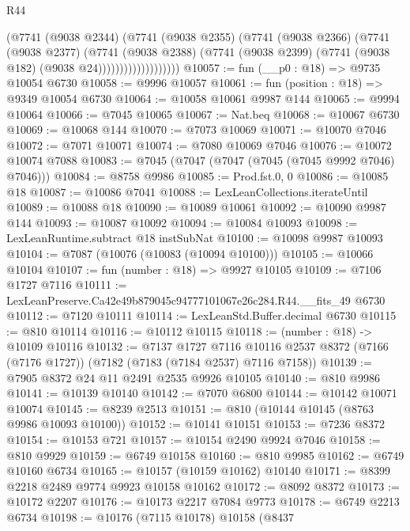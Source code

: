 \begin{lexlean}{R44}
\begin{coremodule}
{                          (@7741
                            (@9038 @2344)
                            (@7741
                              (@9038 @2355)
                              (@7741
                                (@9038 @2366)
                                (@7741
                                  (@9038 @2377)
                                  (@7741
                                    (@9038 @2388)
                                    (@7741
                                      (@9038 @2399)
                                      (@7741 (@9038 @182) (@9038 @24)))))))))))))))))))
@10057 := fun (__p0 : @18) => @9735 @10054 @6730
@10058 := @9996 @10057
@10061 := fun (position : @18) => @9349 @10054 @6730
@10064 := @10058 @10061 @9987 @144
@10065 := @9994 @10064
@10066 := @7045 @10065
@10067 := Nat.beq
@10068 := @10067 @6730
@10069 := @10068 @144
@10070 := @7073 @10069
@10071 := @10070 @7046
@10072 := @7071 @10071
@10074 := @7080 @10069 @7046
@10076 := @10072 @10074 @7088
@10083 := @7045 (@7047 (@7047 (@7045 (@7045 @9992 @7046) @7046)))
@10084 := @8758 @9986
@10085 := Prod.fst.{0, 0}
@10086 := @10085 @18
@10087 := @10086 @7041
@10088 := LexLeanCollections.iterateUntil
@10089 := @10088 @18
@10090 := @10089 @10061
@10092 := @10090 @9987 @144
@10093 := @10087 @10092
@10094 := @10084 @10093
@10098 := LexLeanRuntime.subtract @18 instSubNat
@10100 := @10098 @9987 @10093
@10104 := @7087 (@10076 (@10083 (@10094 @10100)))
@10105 := @10066 @10104
@10107 := fun (number : @18) => @9927 @10105
@10109 := @7106 @1727 @7116
@10111 := LexLeanPreserve.Ca42e49b879045c94777101067e26c284.R44.__fits_49 @6730
@10112 := @7120 @10111
@10114 := LexLeanStd.Buffer.decimal @6730
@10115 := @810 @10114
@10116 := @10112 @10115
@10118 := (number : @18) -> @10109 @10116
@10132 := @7137
    @1727
    @7116
    @10116
    @2537
    @8372
    (@7166 (@7176 @1727))
    (@7182 (@7183 (@7184 @2537) @7116 @7158))
@10139 := @7905 @8372 @24 @11 @2491 @2535 @9926 @10105
@10140 := @810 @9986
@10141 := @10139 @10140
@10142 := @7070 @6800
@10144 := @10142 @10071 @10074
@10145 := @8239 @2513
@10151 := @810 (@10144 @10145 (@8763 @9986 @10093 @10100))
@10152 := @10141 @10151
@10153 := @7236 @8372
@10154 := @10153 @721
@10157 := @10154 @2490 @9924 @7046
@10158 := @810 @9929
@10159 := @6749 @10158
@10160 := @810 @9985
@10162 := @6749 @10160 @6734
@10165 := @10157 (@10159 @10162) @10140
@10171 := @8399 @2218 @2489 @9774 @9923 @10158 @10162
@10172 := @8092 @8372
@10173 := @10172 @2207
@10176 := @10173 @2217 @7084 @9773
@10178 := @6749 @2213 @6734
@10198 := @10176
    (@7115 @10178)
    @10158
    (@8437
}
\end{coremodule}
\end{lexlean}
